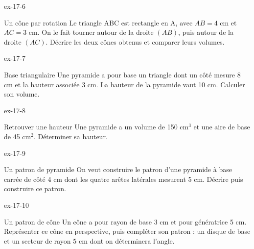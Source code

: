 \begin{blocLivre}{ex-17-6}\begin{exercice}[2]{Un cône par rotation}
Le triangle ABC est rectangle en A, avec $AB=4$ cm et $AC=3$ cm. On le fait tourner autour de la droite $(AB)$, puis autour de la droite $(AC)$. Décrire les deux cônes obtenus et comparer leurs volumes.
\label{fig-ex-17-6}
\end{exercice}\end{blocLivre}
\begin{blocLivre}{ex-17-7}\begin{exercice}[2]{Base triangulaire}
Une pyramide a pour base un triangle dont un côté mesure 8 cm et la hauteur associée 3 cm. La hauteur de la pyramide vaut 10 cm. Calculer son volume.
\label{fig-ex-17-7}
\end{exercice}\end{blocLivre}
\begin{blocLivre}{ex-17-8}\begin{exercice}[2]{Retrouver une hauteur}
Une pyramide a un volume de 150 cm$^3$ et une aire de base de 45 cm$^2$. Déterminer sa hauteur.
\label{fig-ex-17-8}
\end{exercice}\end{blocLivre}
\begin{blocLivre}{ex-17-9}\begin{exercice}[2]{Un patron de pyramide}
On veut construire le patron d’une pyramide à base carrée de côté 4 cm dont les quatre arêtes latérales mesurent 5 cm. Décrire puis construire ce patron.
\label{fig-ex-17-9}
\end{exercice}\end{blocLivre}
\begin{blocLivre}{ex-17-10}\begin{exercice}[2]{Un patron de cône}
Un cône a pour rayon de base 3 cm et pour génératrice 5 cm. Représenter ce cône en perspective, puis compléter son patron : un disque de base et un secteur de rayon 5 cm dont on déterminera l’angle.
\label{fig-ex-17-10}
\end{exercice}\end{blocLivre}

